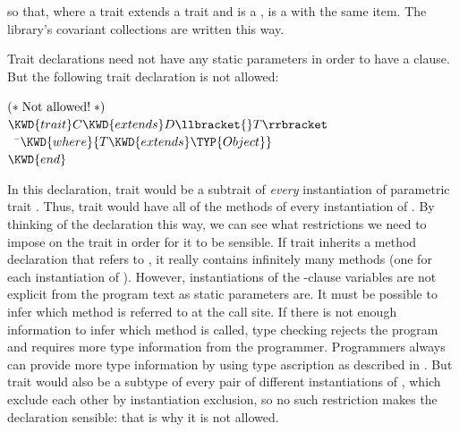so that, where a trait  extends a trait  and 
is a ,
 is a
 with the same item.
The library's covariant collections are written this way.


Trait declarations need not have any static parameters in order
to have a  clause. But the following trait
declaration is not allowed:
\begin{Fortress}
\(\mathtt{(*}\;\hbox{\rm  Not allowed! \unskip}\;\mathtt{*)}\)\\
\(\KWD{trait} C \KWD{extends} D\llbracket{}T\rrbracket\)\\
{\tt~~}\pushtabs\=\+\(  \KWD{where} \{T \KWD{extends} \TYP{Object}\}\)\-\\\poptabs
\(\KWD{end}\)
\end{Fortress}
In this declaration, trait  would be a subtrait of \emph{every}
instantiation of parametric trait . Thus, trait  would have all
of the methods of every instantiation of . By thinking of the
declaration this way, we can see what restrictions we need to impose on
the trait  in order for it to be sensible. If trait
 inherits a method declaration that refers to , it really
contains infinitely many methods (one for each instantiation of ).
However, instantiations of the -clause variables are not
explicit from the program text as static parameters are.
It must be possible to infer which method is referred to at the call site.
If there is not enough information to infer which method is called,
type checking rejects the
program and requires more type information from the programmer.
Programmers always can provide more type information by using type
ascription as described in .
But trait  would also be a subtype of every pair of
different instantiations of ,
which exclude each other by instantiation exclusion,
so no such restriction makes the declaration sensible:
that is why it is not allowed.


